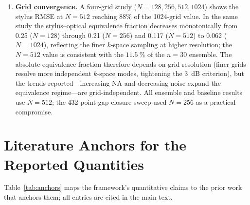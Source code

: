 \documentclass[review,12pt]{elsarticle}
\begin{document}
\begin{enumerate}
    \item \textbf{Grid convergence.} A four-grid study ($N=128,256,512,1024$) shows the stylus RMSE at $N=512$ reaching 88\% of the 1024-grid value. In the same study the stylus--optical equivalence fraction decreases monotonically from 0.25 ($N=128$) through 0.21 ($N=256$) and 0.117 ($N=512$) to 0.062 ($N=1024$), reflecting the finer $k$-space sampling at higher resolution; the $N=512$ value is consistent with the $\SI{11.5}{\percent}$ of the $n=30$ ensemble. The absolute equivalence fraction therefore depends on grid resolution (finer grids resolve more independent $k$-space modes, tightening the \SI{3}{dB} criterion), but the trends reported---increasing NA and decreasing noise expand the equivalence regime---are grid-independent. All ensemble and baseline results use $N=512$; the 432-point gap-closure sweep used $N=256$ as a practical compromise.
\end{enumerate}

\section{Literature Anchors for the Reported Quantities}
\label{S9}

Table~\ref{tab:anchors} maps the framework's quantitative claims to the prior work that anchors them; all entries are cited in the main text.
\end{document}
